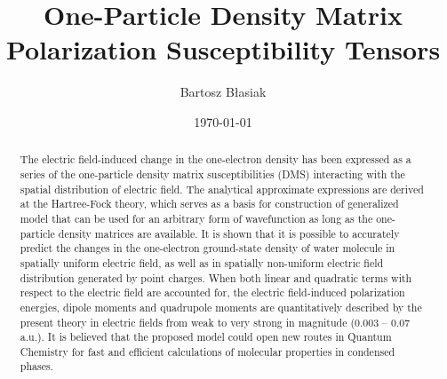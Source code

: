 \documentclass[aip,amsmath,amssymb,reprint,floatfix]{revtex4-1}
\begin{document}

\title{One-Particle Density Matrix Polarization Susceptibility Tensors}

\author{Bartosz B{\l}asiak}

\date{\today}

\begin{abstract}


The electric field\hyp{}induced change in the one\hyp{}electron density
has been expressed as a series of the one\hyp{}particle density matrix 
susceptibilities (DMS) interacting with the spatial distribution of electric field.
The analytical approximate expressions are derived at the Hartree\hyp{}Fock theory, 
which serves as a basis for construction of generalized model 
that can be used for an arbitrary form of wavefunction as long as the one\hyp{}particle
density matrices are available. It is shown that it is possible to accurately predict 
the changes in the one\hyp{}electron ground\hyp{}state density of water molecule 
in spatially uniform electric field, as well as in spatially non\hyp{}uniform 
electric field distribution generated by point charges. When both linear 
and quadratic terms with respect to the electric field are accounted for,
the electric field\hyp{}induced polarization energies, dipole moments 
and quadrupole moments are quantitatively described by the present theory 
in electric fields from weak to very strong in magnitude (0.003 -- 0.07 a.u.).
It is believed that the proposed model could open new routes in Quantum Chemistry 
for fast and efficient calculations of molecular properties in condensed phases.
\end{abstract}

\pacs{}%

\maketitle %
\end{document}
